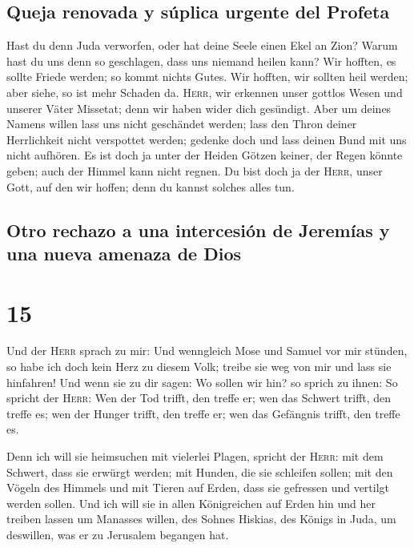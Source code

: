 \hypertarget{queja-renovada-y-suxfaplica-urgente-del-profeta}{%
\subsection{Queja renovada y súplica urgente del
Profeta}\label{queja-renovada-y-suxfaplica-urgente-del-profeta}}

 Hast du denn Juda verworfen, oder hat deine Seele einen
Ekel an Zion? Warum hast du uns denn so geschlagen, dass uns niemand
heilen kann? Wir hofften, es sollte Friede werden; so kommt nichts
Gutes. Wir hofften, wir sollten heil werden; aber siehe, so ist mehr
Schaden da.  \textsc{Herr}, wir erkennen unser gottlos
Wesen und unserer Väter Missetat; denn wir haben wider dich gesündigt.
 Aber um deines Namens willen lass uns nicht geschändet
werden; lass den Thron deiner Herrlichkeit nicht verspottet werden;
gedenke doch und lass deinen Bund mit uns nicht aufhören.
 Es ist doch ja unter der Heiden Götzen keiner, der Regen
könnte geben; auch der Himmel kann nicht regnen. Du bist doch ja der
\textsc{Herr}, unser Gott, auf den wir hoffen; denn du kannst solches
alles tun.

\hypertarget{otro-rechazo-a-una-intercesiuxf3n-de-jeremuxedas-y-una-nueva-amenaza-de-dios}{%
\subsection{Otro rechazo a una intercesión de Jeremías y una nueva
amenaza de
Dios}\label{otro-rechazo-a-una-intercesiuxf3n-de-jeremuxedas-y-una-nueva-amenaza-de-dios}}

\hypertarget{section-14}{%
\section{15}\label{section-14}}

 Und der \textsc{Herr} sprach zu mir: Und wenngleich Mose
und Samuel vor mir stünden, so habe ich doch kein Herz zu diesem Volk;
treibe sie weg von mir und lass sie hinfahren!  Und wenn
sie zu dir sagen: Wo sollen wir hin? so sprich zu ihnen: So spricht der
\textsc{Herr}: Wen der Tod trifft, den treffe er; wen das Schwert
trifft, den treffe es; wen der Hunger trifft, den treffe er; wen das
Gefängnis trifft, den treffe es.

 Denn ich will sie heimsuchen mit vielerlei Plagen,
spricht der \textsc{Herr}: mit dem Schwert, dass sie erwürgt werden; mit
Hunden, die sie schleifen sollen; mit den Vögeln des Himmels und mit
Tieren auf Erden, dass sie gefressen und vertilgt werden sollen.
 Und ich will sie in allen Königreichen auf Erden hin und
her treiben lassen um Manasses willen, des Sohnes Hiskias, des Königs in
Juda, um deswillen, was er zu Jerusalem begangen hat.

